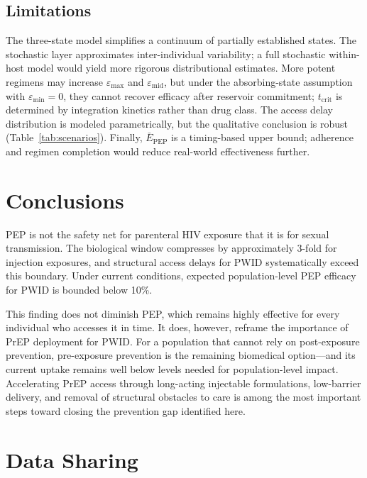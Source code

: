 \documentclass[12pt,a4paper]{article}
\theoremstyle{plain}
\theoremstyle{definition}
\theoremstyle{remark}
\newcommand{\tcrit}{t_{\mathrm{crit}}}
\begin{document}
\subsection{Limitations}

The three-state model simplifies a continuum of partially established states. The stochastic layer approximates inter-individual variability; a full stochastic within-host model would yield more rigorous distributional estimates. More potent regimens may increase $\varepsilon_{\max}$ and $\varepsilon_{\mathrm{mid}}$, but under the absorbing-state assumption with $\varepsilon_{\min} = 0$, they cannot recover efficacy after reservoir commitment; $\tcrit$ is determined by integration kinetics rather than drug class. The access delay distribution is modeled parametrically, but the qualitative conclusion is robust (Table~\ref{tab:scenarios}). Finally, $\bar{E}_{\mathrm{PEP}}$ is a timing-based upper bound; adherence and regimen completion would reduce real-world effectiveness further.


\section{Conclusions}\label{sec:conclusions}

PEP is not the safety net for parenteral HIV exposure that it is for sexual transmission. The biological window compresses by approximately 3-fold for injection exposures, and structural access delays for PWID systematically exceed this boundary. Under current conditions, expected population-level PEP efficacy for PWID is bounded below 10\%.

This finding does not diminish PEP, which remains highly effective for every individual who accesses it in time. It does, however, reframe the importance of PrEP deployment for PWID. For a population that cannot rely on post-exposure prevention, pre-exposure prevention is the remaining biomedical option---and its current uptake remains well below levels needed for population-level impact. Accelerating PrEP access through long-acting injectable formulations, low-barrier delivery, and removal of structural obstacles to care is among the most important steps toward closing the prevention gap identified here.


\section*{Data Sharing}
\end{document}
